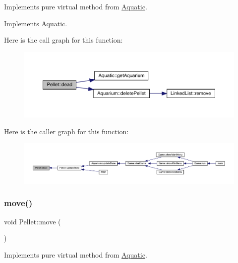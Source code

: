 Implements pure virtual method from \mbox{\hyperlink{class_aquatic}{Aquatic}}. 



Implements \mbox{\hyperlink{class_aquatic_a22fdb11e9cfec922fe50638709768276}{Aquatic}}.

Here is the call graph for this function\+:\nopagebreak
\begin{figure}[H]
\begin{center}
\leavevmode
\includegraphics[width=350pt]{class_pellet_a50bfc2589da43b06640bc5504e3c689b_cgraph}
\end{center}
\end{figure}
Here is the caller graph for this function\+:
\nopagebreak
\begin{figure}[H]
\begin{center}
\leavevmode
\includegraphics[width=350pt]{class_pellet_a50bfc2589da43b06640bc5504e3c689b_icgraph}
\end{center}
\end{figure}
\mbox{\label{class_pellet_a7385101b04083be663ae465c38fd2a4d}} 
\subsubsection{\texorpdfstring{move()}{move()}}
{\footnotesize\ttfamily void Pellet\+::move (\begin{DoxyParamCaption}{ }\end{DoxyParamCaption})\hspace{0.3cm}{\ttfamily [virtual]}}



Implements pure virtual method from \mbox{\hyperlink{class_aquatic}{Aquatic}}. 



